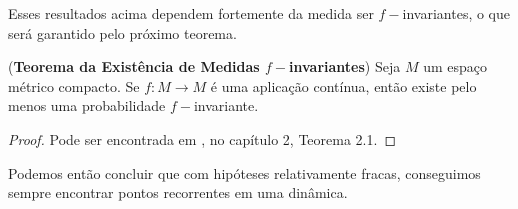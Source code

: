 Esses resultados acima dependem fortemente da medida ser $f-$invariantes, o que será garantido pelo próximo teorema.

\begin{teorema}\label{temi}(\textbf{Teorema da Existência de Medidas $f-$invariantes}) Seja $M$ um espaço métrico compacto. Se $f:M\to M$ é uma aplicação contínua, então existe pelo menos uma probabilidade $f-$invariante.
\end{teorema}

\begin{proof} Pode ser encontrada em \cite{viana}, no capítulo 2, Teorema 2.1.
\end{proof}

Podemos então concluir que com hipóteses relativamente fracas, conseguimos sempre encontrar pontos recorrentes em uma dinâmica.

